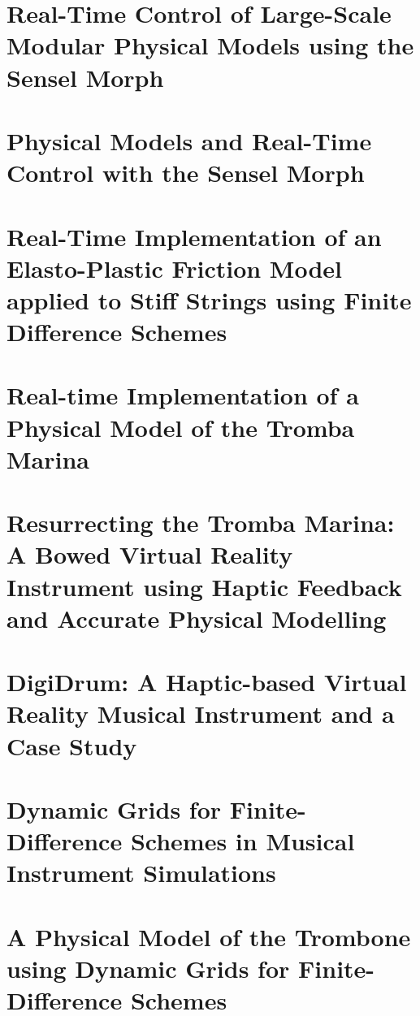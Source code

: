 
\chapter{Real-Time Control of Large-Scale Modular Physical Models using the Sensel Morph}\label{paper:A}


\chapter{Physical Models and Real-Time Control with the Sensel Morph}\label{paper:B}


\chapter{Real-Time Implementation of an Elasto-Plastic Friction Model applied to Stiff Strings using Finite Difference Schemes}\label{paper:C}


\chapter{Real-time Implementation of a Physical Model of the Tromba Marina}\label{paper:D}


\chapter{Resurrecting the Tromba Marina: A Bowed Virtual Reality Instrument using Haptic Feedback and Accurate Physical Modelling}\label{paper:E}


\chapter{DigiDrum: A Haptic-based Virtual Reality Musical Instrument and a Case Study}\label{paper:F}


\chapter{Dynamic Grids for Finite-Difference Schemes in Musical Instrument Simulations}\label{paper:G}

\chapter{A Physical Model of the Trombone using Dynamic Grids for Finite-Difference Schemes}\label{paper:H}